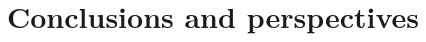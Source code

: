 \documentclass[english]{article}
\begin{document}

\section{Conclusions and perspectives}

\end{document}
